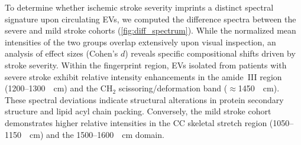 \documentclass[preprint,12pt]{elsarticle}
\begin{document}



To determine whether ischemic stroke severity imprints a distinct spectral signature upon circulating EVs, we computed the difference spectra between the severe and mild stroke cohorts (\cref{fig:diff_spectrum}). While the normalized mean intensities of the two groups overlap extensively upon visual inspection, an analysis of effect sizes (Cohen's $d$) reveals specific compositional shifts driven by stroke severity. Within the fingerprint region, EVs isolated from patients with severe stroke exhibit relative intensity enhancements in the amide~III region (1200--1300~\si{\per\centi\metre}) and the CH$_2$ scissoring/deformation band ($\approx$1450~\si{\per\centi\metre}). These spectral deviations indicate structural alterations in protein secondary structure and lipid acyl chain packing. Conversely, the mild stroke cohort demonstrates higher relative intensities in the C\textendash C skeletal stretch region (1050--1150~\si{\per\centi\metre}) and the 1500--1600~\si{\per\centi\metre} domain.
\end{document}
